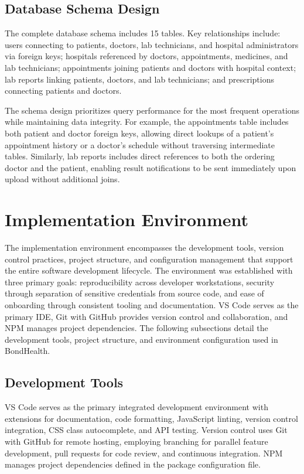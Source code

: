 \subsection{Database Schema Design}

\justifying
\noindent The complete database schema includes 15 tables. Key relationships include: users connecting to patients, doctors, lab technicians, and hospital administrators via foreign keys; hospitals referenced by doctors, appointments, medicines, and lab technicians; appointments joining patients and doctors with hospital context; lab reports linking patients, doctors, and lab technicians; and prescriptions connecting patients and doctors.

\justifying
\noindent The schema design prioritizes query performance for the most frequent operations while maintaining data integrity. For example, the appointments table includes both patient and doctor foreign keys, allowing direct lookups of a patient's appointment history or a doctor's schedule without traversing intermediate tables. Similarly, lab reports includes direct references to both the ordering doctor and the patient, enabling result notifications to be sent immediately upon upload without additional joins.

\section{Implementation Environment}

\justifying
\noindent The implementation environment encompasses the development tools, version control practices, project structure, and configuration management that support the entire software development lifecycle. The environment was established with three primary goals: reproducibility across developer workstations, security through separation of sensitive credentials from source code, and ease of onboarding through consistent tooling and documentation. VS Code serves as the primary IDE, Git with GitHub provides version control and collaboration, and NPM manages project dependencies. The following subsections detail the development tools, project structure, and environment configuration used in BondHealth.

\subsection{Development Tools}

\justifying
\noindent VS Code serves as the primary integrated development environment with extensions for documentation, code formatting, JavaScript linting, version control integration, CSS class autocomplete, and API testing. Version control uses Git with GitHub for remote hosting, employing branching for parallel feature development, pull requests for code review, and continuous integration. NPM manages project dependencies defined in the package configuration file.

